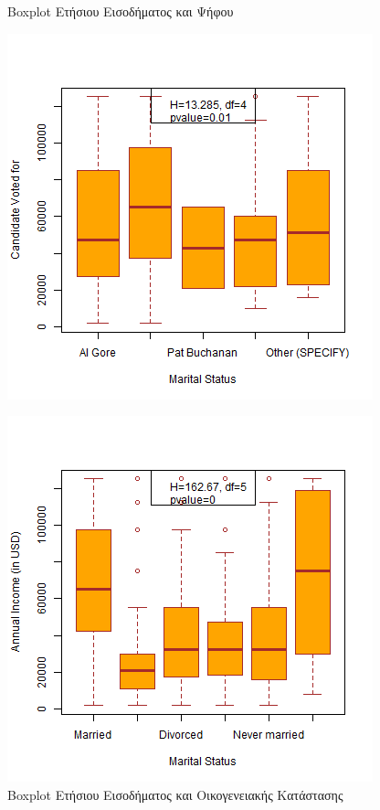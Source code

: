 \documentclass[10pt, letterpaper]{article}
\begin{document}
        \begin{figure}[h!]
        \centering
            \begin{minipage}{.5\textwidth}
                \caption{Boxplot Ετήσιου Εισοδήματος και Ψήφου}
                \label{incomevoteplot}
                \centering
                \includegraphics[width=0.9\linewidth]{resources/Income_Vote_Plot.png}
            \end{minipage}%
            \begin{minipage}{.5\textwidth}
                \caption{Boxplot Ετήσιου Εισοδήματος και Οικογενειακής Κατάστασης}
                \label{incomemaritalplot}
                \centering
                \includegraphics[width=0.9\linewidth]{resources/Income_MaritalStatus_Plot.png}
            \end{minipage}
            \label{boxplots1}
        \end{figure}
\end{document}
